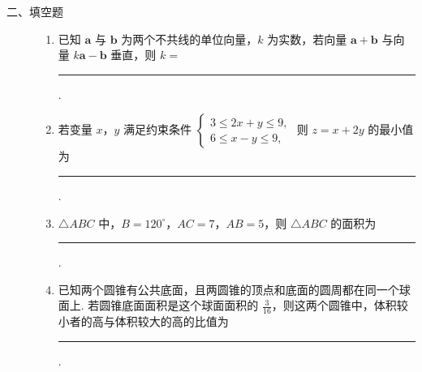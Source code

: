 \begin{description}

    \item[二、填空题]

    \begin{enumerate}[leftmargin=5pt]

      \addtocounter{enumi}{+12}

        \item 已知 \(\bm{a}\) 与 \(\bm{b}\) 为两个不共线的单位向量，\(k\) 为实数，若向量 \(\bm{a} + \bm{b}\) 与向量 \(k\bm{a} - \bm{b}\) 垂直，则 \(k = \)\rule[-0.3ex]{3em}{0.4pt}.

        \item 若变量 \(x\)，\(y\) 满足约束条件 \(\begin{cases}
3 \leqslant 2x + y \leqslant 9,\\
6 \leqslant x - y \leqslant 9,
\end{cases}\) 则 \(z = x + 2y\) 的最小值为\rule[-0.3ex]{3em}{0.4pt}.

        \item \(\triangle ABC\) 中，\(B = 120^{\circ}\)，\(AC = 7\)，\(AB = 5\)，则 \(\triangle ABC\) 的面积为\rule[-0.3ex]{3em}{0.4pt}.

        \item 已知两个圆锥有公共底面，且两圆锥的顶点和底面的圆周都在同一个球面上. 若圆锥底面面积是这个球面面积的 \(\frac{3}{16}\)，则这两个圆锥中，体积较小者的高与体积较大的高的比值为\rule[-0.3ex]{3em}{0.4pt}.

    \end{enumerate}

\end{description}


